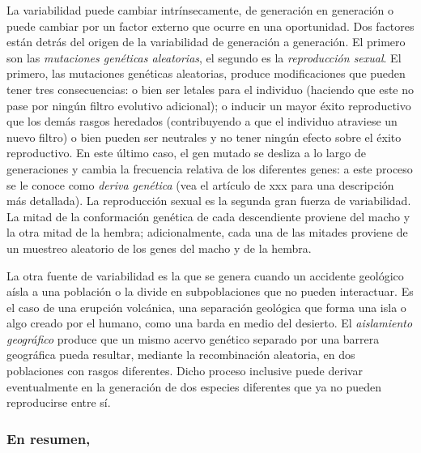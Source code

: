 \documentclass[
  a4paper,
  DIV=11,
  numbers=noendperiod]{scrreprt}
\begin{document}
La variabilidad puede cambiar intrínsecamente, de generación en
generación o puede cambiar por un factor externo que ocurre en una
oportunidad. Dos factores están detrás del origen de la variabilidad de
generación a generación. El primero son las \emph{mutaciones genéticas
aleatorias}, el segundo es la \emph{reproducción sexual}. El primero,
las mutaciones genéticas aleatorias, produce modificaciones que pueden
tener tres consecuencias: o bien ser letales para el individuo (haciendo
que este no pase por ningún filtro evolutivo adicional); o inducir un
mayor éxito reproductivo que los demás rasgos heredados (contribuyendo a
que el individuo atraviese un nuevo filtro) o bien pueden ser neutrales
y no tener ningún efecto sobre el éxito reproductivo. En este último
caso, el gen mutado se desliza a lo largo de generaciones y cambia la
frecuencia relativa de los diferentes genes: a este proceso se le conoce
como \emph{deriva genética} (vea el artículo de xxx para una descripción
más detallada). La reproducción sexual es la segunda gran fuerza de
variabilidad. La mitad de la conformación genética de cada descendiente
proviene del macho y la otra mitad de la hembra; adicionalmente, cada
una de las mitades proviene de un muestreo aleatorio de los genes del
macho y de la hembra.

La otra fuente de variabilidad es la que se genera cuando un accidente
geológico aísla a una población o la divide en subpoblaciones que no
pueden interactuar. Es el caso de una erupción volcánica, una separación
geológica que forma una isla o algo creado por el humano, como una barda
en medio del desierto. El \emph{aislamiento geográfico} produce que un
mismo acervo genético separado por una barrera geográfica pueda
resultar, mediante la recombinación aleatoria, en dos poblaciones con
rasgos diferentes. Dicho proceso inclusive puede derivar eventualmente
en la generación de dos especies diferentes que ya no pueden
reproducirse entre sí.

\subsubsection{En resumen,}\label{en-resumen}
\end{document}
